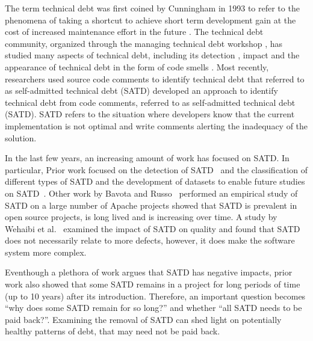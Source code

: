 
The term technical debt was first coined by Cunningham in 1993 to refer to the phenomena of taking a shortcut to achieve short term development gain at the cost of increased maintenance effort in the future \cite{Cunningham1992WPM}. The technical debt community, organized through the managing technical debt workshop \cite{MTD2016}, has studied many aspects of technical debt, including its detection \cite{Zazworka2013EASE}, impact \cite{Zazworka2011MTD} and the appearance of technical debt in the form of code smells \cite{Fontana2012MTD}. Most recently, researchers used source code comments to identify technical debt that referred to as self-admitted technical debt (SATD)\cite{Potdar2014ICSME}  developed an approach to identify technical debt from code comments, referred to as self-admitted technical debt (SATD). SATD refers to the situation where developers know that the current implementation is not optimal and write comments alerting the inadequacy of the solution. 


In the last few years, an increasing amount of work has focused on SATD. In particular, Prior work focused on the detection of SATD~\cite{Potdar2014ICSME} and the classification of different types of SATD and the development of datasets to enable future studies on SATD~\cite{Maldonado2015MTD}. Other work by Bavota and Russo~\cite{Bavota2016MSR} performed an empirical study of SATD on a large number of Apache projects showed that SATD is prevalent in open source projects, is long lived and is increasing over time. A study by Wehaibi et al.~\cite{Wehaibi2016SANER} examined the impact of SATD on quality and found that SATD does not necessarily relate to more defects, however, it does make the software system more complex.

Eventhough a plethora of work argues that SATD has negative impacts, prior work also showed that some SATD remains in a project for long periods of time (up to 10 years) after its introduction. Therefore, an important question becomes ``why does some SATD remain for so long?'' and whether ``all SATD needs to be paid back?''. Examining the removal of SATD can shed light on potentially healthy patterns of debt, that may need not be paid back.

